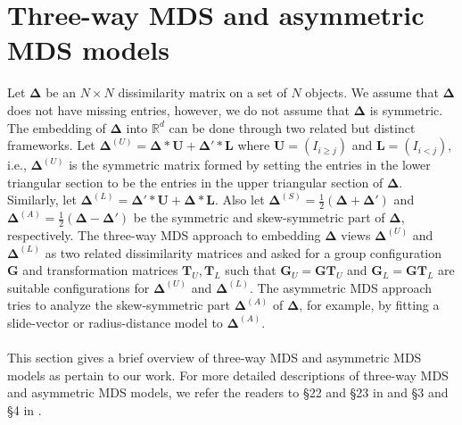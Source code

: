 \documentclass[11pt]{asaproc}
\begin{document}
\section{Three-way MDS and asymmetric MDS models}
\label{sec:three-way-mds}
Let $\bm{\Delta}$ be an $N \times N$ dissimilarity matrix on a set of
$N$ objects. We assume that $\bm{\Delta}$ does not have missing
entries, however, we do not assume that $\bm{\Delta}$ is
symmetric. The embedding of $\bm{\Delta}$ into $\mathbb{R}^{d}$ can be
done through two related but distinct frameworks. Let
$\bm{\Delta}^{(U)} = \bm{\Delta} \ast \mathbf{U} + \bm{\Delta}' \ast
\mathbf{L}$ where $\mathbf{U} = (I_{i \geq j})$ and $\mathbf{L} =
(I_{i < j})$, i.e., $\bm{\Delta}^{(U)}$ is the symmetric matrix formed
by setting the entries in the lower triangular section to be the
entries in the upper triangular section of $\bm{\Delta}$. Similarly,
let $\bm{\Delta}^{(L)} = \bm{\Delta}' \ast \mathbf{U} + \bm{\Delta}
\ast \mathbf{L}$. Also let $\bm{\Delta}^{(S)} =
\tfrac{1}{2}(\bm{\Delta} + \bm{\Delta}')$ and $\bm{\Delta}^{(A)} =
\tfrac{1}{2}(\bm{\Delta} - \bm{\Delta}')$ be the symmetric and
skew-symmetric part of $\bm{\Delta}$, respectively. The three-way MDS
approach to embedding $\bm{\Delta}$ views $\bm{\Delta}^{(U)}$ and
$\bm{\Delta}^{(L)}$ as two related dissimilarity matrices and asked
for a group configuration $\mathbf{G}$ and transformation matrices
$\mathbf{T}_{U}, \mathbf{T}_L$ such that $\mathbf{G}_U = \mathbf{G}
\mathbf{T}_U$ and $\mathbf{G}_L = \mathbf{G} \mathbf{T}_L$ are
suitable configurations for $\bm{\Delta}^{(U)}$ and
$\bm{\Delta}^{(L)}$. The asymmetric MDS approach tries to analyze the
skew-symmetric part $\bm{\Delta}^{(A)}$ of $\bm{\Delta}$, for example,
by fitting a slide-vector or radius-distance model to
$\bm{\Delta}^{(A)}$. \\ \\
%
%
\noindent
This section gives a brief overview of three-way MDS and asymmetric
MDS models as pertain to our work. For more detailed descriptions of
three-way MDS and asymmetric MDS models, we refer the readers to \S 22
and \S 23 in \citet{borg05:_moder} and \S 3 and \S 4 in
\citet{saito05:_data_analy_asymm_struc}.
%
%
\end{document}
